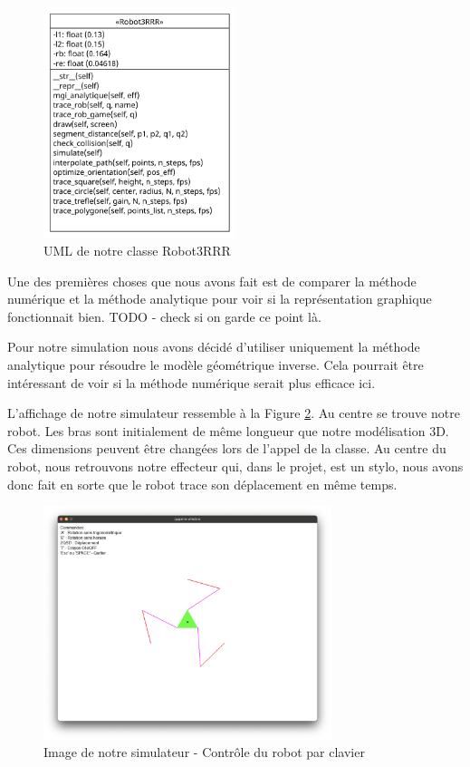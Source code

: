 \documentclass[a4paper, 11pt]{report}
\begin{document}
\begin{figure}[!htb]
    \centering
    \includegraphics[width=0.5\textwidth]{Figures/robot_3rrr_uml.pdf}
    \caption{UML de notre classe Robot3RRR}
    \label{fig:uml_class}
\end{figure}

Une des premières choses que nous avons fait est de comparer la méthode numérique et la méthode analytique pour voir si la représentation graphique fonctionnait bien. TODO - check si on garde ce point là.

Pour notre simulation nous avons décidé d'utiliser uniquement la méthode analytique pour résoudre le modèle géométrique inverse. Cela pourrait être intéressant de voir si la méthode numérique serait plus efficace ici.

L'affichage de notre simulateur ressemble à la Figure \ref{fig:image_simu}. Au centre se trouve notre robot. Les bras sont initialement de même longueur que notre modélisation 3D. Ces dimensions peuvent être changées lors de l'appel de la classe. Au centre du robot, nous retrouvons notre effecteur qui, dans le projet, est un stylo, nous avons donc fait en sorte que le robot trace son déplacement en même temps. 
\begin{figure}[!htb]
    \centering
    \includegraphics[width=0.75\textwidth]{Figures/image_affichagesimu.png}
    \caption{Image de notre simulateur - Contrôle du robot par clavier}
    \label{fig:image_simu}
\end{figure}
\end{document}
